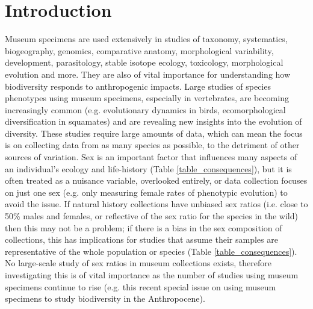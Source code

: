 \documentclass[a4paper, 12pt]{article}
\begin{document}
\section{Introduction}\label{main}
Museum specimens are used extensively in studies of taxonomy, systematics, biogeography, genomics, comparative anatomy, morphological variability, development, parasitology, stable isotope ecology, toxicology, morphological evolution and more\cite{lister2011natural,pyke2010biological,mclean2015natural}. 
They are also of vital importance for understanding how biodiversity responds to anthropogenic impacts\cite{meineke2018biological}. 
Large studies of species phenotypes using museum specimens, especially in vertebrates, are becoming increasingly common (e.g. evolutionary dynamics in birds\cite{cooney2017mega}, ecomorphological diversification in squamates\cite{watanabe2019}) and are revealing new insights into the evolution of diversity. 
These studies require large amounts of data, which can mean the focus is on collecting data from as many species as possible, to the detriment of other sources of variation. 
Sex is an important factor that influences many aspects of an individual's ecology and life-history (Table \ref{table_consequences}), but it is often treated as a nuisance variable, overlooked entirely, or data collection focuses on just one sex (e.g. only measuring female rates of phenotypic evolution\cite{cooper2009factors}) to avoid the issue. 
If natural history collections have unbiased sex ratios (i.e. close to 50\% males and females, or reflective of the sex ratio for the species in the wild\cite{karlin1986theoretical}) then this may not be a problem; if there is a bias in the sex composition of collections, this has implications for studies that assume their samples are representative of the whole population or species (Table \ref{table_consequences}). 
No large-scale study of sex ratios in museum collections exists, therefore investigating this is of vital importance as the number of studies using museum specimens continue to rise (e.g. this recent special issue on using museum specimens to study biodiversity in the Anthropocene\cite{meineke2018biological}).
\end{document}
